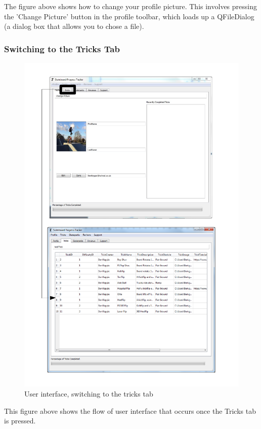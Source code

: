 The figure above shows how to change your profile picture. This involves pressing the 'Change Picture' button in the profile toolbar, which loads up a QFileDialog (a dialog box that allows you to chose a file).


\subsubsection{Switching to the Tricks Tab}

\begin{figure}[H]
    \includegraphics[width=\textwidth]{./Maintenance/Figures/TricksTab.pdf}
    \caption{User interface, switching to the tricks tab} \label{fig:Trick Tab UI}
\end{figure}

This figure above shows the flow of user interface that occurs once the Tricks tab is pressed.

